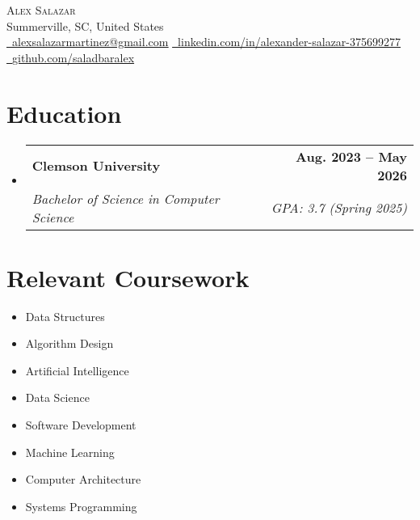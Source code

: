 \documentclass[letterpaper,11pt]{article}
\makeatletter
\newcommand{\resumeSubheading}[4]{
  \vspace{-2pt}\item[]
    \begin{tabular*}{1.0\textwidth}[t]{l@{\extracolsep{\fill}}r}
      \textbf{#1} & \textbf{\small #2} \\
      \textit{\small#3} & \textit{\small #4} \\
    \end{tabular*}\vspace{-7pt}
}
\makeatother
\begin{document}
\begin{center}
    {\Huge \scshape Alex Salazar} \\ \vspace{1pt}
    Summerville, SC, United States \\ \vspace{1pt}
    \small \href{mailto:alexsalazarmartinez@gmail.com}{\faEnvelope\ \underline{alexsalazarmartinez@gmail.com}} \hspace{0.3cm}
    \href{https://www.linkedin.com/in/alexander-salazar-375699277}{\faLinkedin\ \underline{linkedin.com/in/alexander-salazar-375699277}} \hspace{0.3cm}
    \href{https://github.com/saladbaralex}{\faGithub\ \underline{github.com/saladbaralex}}
    \vspace{-8pt}
\end{center}

\section{Education}
\begin{itemize}  %
    \resumeSubheading{Clemson University}{Aug. 2023 -- May 2026}{Bachelor of Science in Computer Science}{GPA: 3.7 (Spring 2025)}
\end{itemize}

\section{Relevant Coursework}
\begin{multicols}{4}
    \begin{itemize}[itemsep=-5pt, parsep=3pt]
        \item Data Structures
        \item Algorithm Design
        \item Artificial Intelligence
        \item Data Science
        \item Software Development
        \item Machine Learning
        \item Computer Architecture
        \item Systems Programming
    \end{itemize}
\end{multicols}

\end{document}
